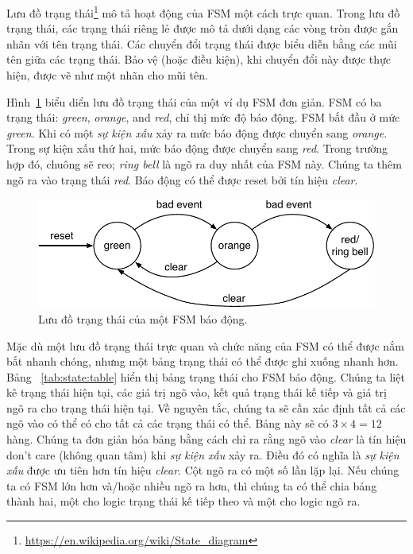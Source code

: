 \documentclass[%
    10pt,
    headinclude, footexclude,
    openright, %
    notitlepage,
    cleardoubleempty,
    headsepline,
    pointlessnumbers,
    bibtotoc, idxtotoc,
    ]{scrbook}
\newcommand{\scale}{0.7}
\newcommand{\myref}[2]{\href{#1}{#2}}
\renewcommand{\myref}[2]{{#2}{\footnote{\url{#1}}}}
\begin{document}
\myref{https://en.wikipedia.org/wiki/State_diagram}{Lưu đồ trạng thái} mô tả hoạt động của FSM một cách trực quan.
Trong lưu đồ trạng thái, các trạng thái riêng lẻ được mô tả dưới dạng các vòng tròn được gắn nhãn với tên trạng thái. Các chuyển đổi trạng thái được biểu diễn bằng các mũi tên giữa các trạng thái. Bảo vệ (hoặc điều kiện), khi chuyển đổi này được thực hiện, được vẽ như một nhãn cho mũi tên. 


Hình~\ref{fig:diag-moore} biểu diển lưu đồ trạng thái của một ví dụ FSM đơn giản.
FSM có ba trạng thái: \emph{green}, \emph{orange}, and \emph{red},
chỉ thị mức độ báo động. FSM bắt đầu ở mức \emph{green}.
Khi có một \emph{sự kiện xấu} xảy ra mức báo động được chuyển sang \emph{orange}.
Trong sự kiện xấu thứ hai, mức báo động được chuyển sang \emph{red}.
Trong trường hợp đó, chuông sẽ reo; \emph{ring bell} là ngõ ra duy nhất của FSM này.
Chúng ta thêm ngõ ra vào trạng thái \emph{red}.
Báo động có thể được reset bởi tín hiệu \emph{clear}.

\begin{figure}
  \centering
  \includegraphics[scale=\scale]{figures/state-diag-moore}
  \caption{Lưu đồ trạng thái của một FSM báo động.}
  \label{fig:diag-moore}
\end{figure}

Mặc dù một lưu đồ trạng thái trực quan và chức năng của FSM có thể được nắm bắt nhanh chóng, nhưng một bảng trạng thái có thể được ghi xuống nhanh hơn. Bảng ~\ref{tab:state:table} hiển thị bảng trạng thái cho FSM báo động. Chúng ta liệt kê trạng thái hiện tại, các giá trị ngõ vào, kết quả trạng thái kế tiếp và giá trị ngõ ra cho trạng thái hiện tại. Về nguyên tắc, chúng ta sẽ cần xác định tất cả các ngõ vào có thể có cho tất cả các trạng thái có thể. Bảng này sẽ có $3 \times 4 = 12$ hàng. Chúng ta đơn giản hóa bảng bằng cách chỉ ra rằng ngõ vào \emph{clear} là tín hiệu don't care (không quan tâm) khi \emph{sự kiện xấu} xảy ra. Điều đó có nghĩa là \emph{sự kiện xấu} được ưu tiên hơn tín hiệu \emph{clear}. Cột ngõ ra có một số lần lặp lại. Nếu chúng ta có FSM lớn hơn và/hoặc nhiều ngõ ra hơn, thì chúng ta có thể chia bảng thành hai, một cho logic trạng thái kế tiếp theo và một cho logic ngõ ra. 
\end{document}
